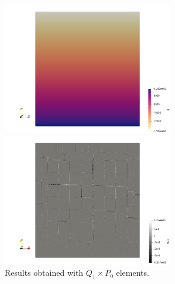 \begin{center}
\includegraphics[width=7.5cm]{python_codes/fieldstone_25/results/q}
\includegraphics[width=7.5cm]{python_codes/fieldstone_25/results/divv}\\
{\captionfont Results obtained with $Q_1\times P_0$ elements.}
\end{center}









